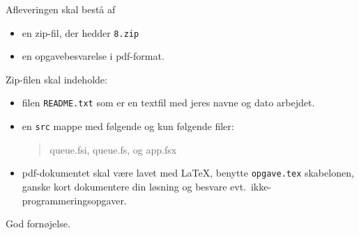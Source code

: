 \documentclass[a4paper,12pt]{article}
\newcommand{\exerciseNumber}{8}
\begin{document}
Afleveringen skal bestå af
\begin{itemize}
  \item en zip-fil, der hedder \texttt{\exerciseNumber\typeLetter.zip}
  \item en opgavebesvarelse i pdf-format.
\end{itemize}
Zip-filen skal indeholde:
\begin{itemize}
\item filen \texttt{README.txt} som er en textfil med jeres navne og dato arbejdet.
\item en \texttt{src} mappe med følgende og kun
  følgende filer:
  \begin{quote}
    queue.fsi, queue.fs, og app.fsx
  \end{quote}
  \item pdf-dokumentet skal være lavet med \LaTeX, benytte \lstinline[language=console]{opgave.tex} skabelonen, ganske kort dokumentere din løsning og besvare evt.\ ikke-programmeringsopgaver.
\end{itemize}

\flushright God fornøjelse.
\end{document}
